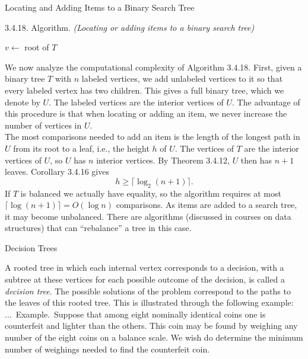 \documentclass[smaller,hyperref={CJKbookmarks=true}]{beamer}
\newcounter{zhuo}[subsection]
\renewcommand{\thezhuo}{\thesection.\thesubsection.\arabic{zhuo}}
\newenvironment{EXAMPLE}{\stepcounter{zhuo}\alert{\!\thezhuo.~Example.\,}}{}
\begin{document}
\begin{frame}{Locating and Adding Items to a Binary Search Tree}
\begin{spacing}{1.05}
\alert{3.4.18. Algorithm.} \emph{(Locating or adding items to a binary search tree)}
\IncMargin{1em}
\begin{algorithm}[H]
$v\leftarrow$ root of $T$\;
~\;
\end{algorithm}\DecMargin{1em}
\end{spacing}
\newpage
\begin{spacing}{0.95}
We now analyze the computational complexity of Algorithm 3.4.18. First,
given a binary tree $T$ with $n$ labeled vertices, we add unlabeled vertices to
it so that every labeled vertex has two children. This gives a full binary
tree, which we denote by $U$. The labeled vertices are the interior vertices
of $U$. The advantage of this procedure is that when locating or adding an
item, we never increase the number of vertices in $U$.\\[6pt]
The most comparisons needed to add an item is the length of the longest
path in $U$ from its root to a leaf, i.e., the height $h$ of $U$. The vertices of $T$
are the interior vertices of $U$, so $U$ has $n$ interior vertices. By Theorem
3.4.12, $U$ then has $n+1$ leaves. Corollary 3.4.16 gives
\[h\geq\lceil\log_2(n+1)\rceil.\]
If $T$ is balanced we actually have equality, so the algorithm requires at most $\lceil\log(n+1)\rceil=O(\log n)$ comparisons. As items are added to a search tree, it may become unbalanced. There are algorithms (discussed in
courses on data structures) that can ``rebalance'' a tree in this case.
\end{spacing}
\end{frame}
\begin{frame}[c]{Decision Trees}
\begin{spacing}{1.2}
A rooted tree in which each internal vertex corresponds to a decision, with
a subtree at these vertices for each possible outcome of the decision, is
called a \emph{decision tree}. The possible solutions of the problem correspond to
the paths to the leaves of this rooted tree. This is illustrated through the
following example:\\[6pt]
\begin{EXAMPLE}
Suppose that among eight nominally identical coins one
is counterfeit and lighter than the others. This coin may be found by
weighing any number of the eight coins on a balance scale. We wish do
determine the minimum number of weighings needed to find the
counterfeit coin.
\end{EXAMPLE}
\end{spacing}
\end{frame}
\end{document}
